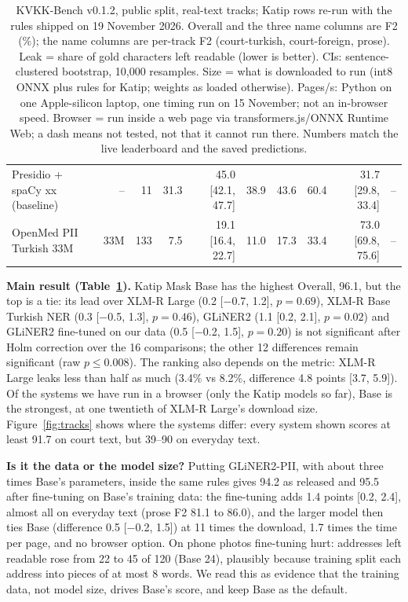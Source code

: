\documentclass[10pt,twocolumn]{article}
\begin{document}
\begin{table}[t]
\begin{tabular}{@{}lrrrrrrrrr@{}}
Presidio + spaCy xx (baseline) & -- & 11 & 31.3 & 45.0 [42.1, 47.7] & 38.9 & 43.6 & 60.4 & 31.7 [29.8, 33.4] & -- \\
OpenMed PII Turkish 33M & 33M & 133 & 7.5 & 19.1 [16.4, 22.7] & 11.0 & 17.3 & 33.4 & 73.0 [69.8, 75.6] & -- \\
\bottomrule
\end{tabular}
\caption{KVKK-Bench v0.1.2, public split, real-text tracks; Katip rows re-run with the rules shipped on 19 November 2026. Overall and the three name columns are F2 (\%); the
name columns are per-track F2 (court-turkish, court-foreign, prose). Leak = share of gold characters left
readable (lower is better). CIs: sentence-clustered bootstrap, 10,000 resamples. Size = what is downloaded to run
(int8 ONNX plus rules for Katip; weights as loaded otherwise). Pages/s: Python on one Apple-silicon laptop, one timing run on 15 November; not an
in-browser speed. Browser = run inside a web page via transformers.js/ONNX Runtime Web; a dash means not
tested, not that it cannot run there. Numbers match the live leaderboard and the saved predictions.}
\label{tab:main}
\end{table}

\textbf{Main result (Table~\ref{tab:main}).} Katip Mask Base has the highest Overall, 96.1, but the top is a tie:
its lead over XLM-R Large (0.2 [$-$0.7, 1.2], $p=0.69$), XLM-R Base Turkish NER (0.3 [$-$0.5, 1.3], $p=0.46$),
GLiNER2 (1.1 [0.2, 2.1], $p=0.02$) and GLiNER2 fine-tuned on our data (0.5 [$-$0.2, 1.5], $p=0.20$) is not significant after Holm correction over the 16 comparisons; the
other 12 differences remain significant (raw $p\le0.008$). The ranking also depends on the metric: XLM-R Large leaks less than half
as much (3.4\% vs 8.2\%, difference 4.8 points [3.7, 5.9]). Of the systems we have run in a browser (only the
Katip models so far), Base is the strongest, at one twentieth of XLM-R Large's download size. Figure~\ref{fig:tracks} shows where the systems differ: every system shown scores at least 91.7 on court text, but 39--90 on everyday text.

\textbf{Is it the data or the model size?} Putting GLiNER2-PII, with about three times Base's parameters, inside the same rules
gives 94.2 as released and 95.5 after fine-tuning on Base's training data: the fine-tuning adds 1.4 points [0.2, 2.4],
almost all on everyday text (prose F2 81.1 to 86.0), and the larger model then ties Base (difference 0.5 [$-$0.2, 1.5]) at 11 times the
download, 1.7 times the time per page, and no browser option. On phone photos fine-tuning hurt: addresses left readable rose from
22 to 45 of 120 (Base 24), plausibly because training split each address into pieces of at most 8 words. We read this as evidence that
the training data, not model size, drives Base's score, and keep Base as the default.
\end{document}
